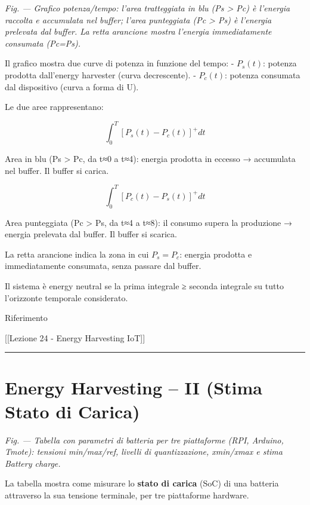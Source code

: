 \documentclass[
  italian,
  openany]{book}
\begin{document}
\emph{Fig. --- Grafico potenza/tempo: l'area tratteggiata in blu (Ps
\textgreater{} Pc) è l'energia raccolta e accumulata nel buffer; l'area
punteggiata (Pc \textgreater{} Ps) è l'energia prelevata dal buffer. La
retta arancione mostra l'energia immediatamente consumata (Pc=Ps).}

Il grafico mostra due curve di potenza in funzione del tempo: -
\(P_s(t)\): potenza prodotta dall'energy harvester (curva decrescente).
- \(P_c(t)\): potenza consumata dal dispositivo (curva a forma di U).

Le due aree rappresentano:

\[\int_0^T [P_s(t) - P_c(t)]^+ dt\]

Area in blu (Ps \textgreater{} Pc, da t≈0 a t≈4): energia prodotta in
eccesso → accumulata nel buffer. Il buffer si carica.

\[\int_0^T [P_c(t) - P_s(t)]^+ dt\]

Area punteggiata (Pc \textgreater{} Ps, da t≈4 a t≈8): il consumo supera
la produzione → energia prelevata dal buffer. Il buffer si scarica.

La retta arancione indica la zona in cui \(P_s = P_c\): energia prodotta
e immediatamente consumata, senza passare dal buffer.

Il sistema è energy neutral se la prima integrale ≥ seconda integrale su
tutto l'orizzonte temporale considerato.

\begin{calloutnote}{Riferimento}

{[}{[}Lezione 24 - Energy Harvesting IoT{]}{]}

\end{calloutnote}

\begin{center}\rule{0.5\linewidth}{0.5pt}\end{center}

\section{Energy Harvesting -- II (Stima Stato di
Carica)}\label{energy-harvesting-ii-stima-stato-di-carica}

\emph{Fig. --- Tabella con parametri di batteria per tre piattaforme
(RPI, Arduino, Tmote): tensioni min/max/ref, livelli di quantizzazione,
xmin/xmax e stima Battery charge.}

La tabella mostra come misurare lo \textbf{stato di carica} (SoC) di una
batteria attraverso la sua tensione terminale, per tre piattaforme
hardware.
\end{document}
